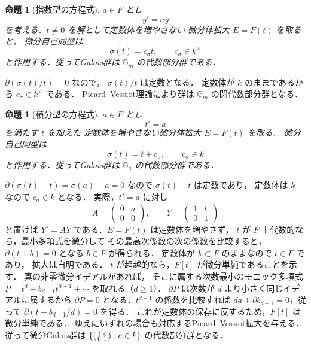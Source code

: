 \documentclass[a5paper,10pt,onecolumn]{jsarticle}
\makeatletter
\theoremstyle{mathnotetheorem}
\newtheorem{proposition}[theorem]{命題}
\renewcommand{\proofname}{証明}
\renewenvironment{proof}[1][\proofname]{%
  \par\pushQED{\qed}\normalfont\topsep4\p@\@plus2\p@\relax
  \trivlist\item[\hskip\labelsep\bfseries #1]\ignorespaces
}{\popQED\endtrivlist\@endpefalse}
\makeatother
\begin{document}
\begin{proposition}[指数型の方程式]\label{prop:exp}
$a\in F$ とし
\[
 y'=ay
\]
を考える．$t\ne0$ を解として定数体を増やさない
微分体拡大 $E=F(t)$ を取ると，
微分自己同型は
\[
 \sigma(t)=c_\sigma t,\qquad c_\sigma\in k^\times
\]
と作用する．従ってGalois群は
$\mathbb G_m$ の代数部分群である．
\end{proposition}
\begin{proof}
$\partial(\sigma(t)/t)=0$ なので，
$\sigma(t)/t$ は定数となる．
定数体が $k$ のままであるから
$c_\sigma\in k^\times$ である．
Picard--Vessiot理論により群は
$\mathbb G_m$ の閉代数部分群となる．
\end{proof}

\begin{proposition}[積分型の方程式]\label{prop:int}
$a\in F$ とし
\[
 t'=a
\]
を満たす $t$ を加えた
定数体を増やさない微分体拡大 $E=F(t)$ を取る．
微分自己同型は
\[
 \sigma(t)=t+c_\sigma,\qquad c_\sigma\in k
\]
と作用する．従ってGalois群は
$\mathbb G_a$ の代数部分群である．
\end{proposition}
\begin{proof}
$\partial(\sigma(t)-t)=\sigma(a)-a=0$ なので
$\sigma(t)-t$ は定数であり，
定数体は $k$ なので $c_\sigma\in k$ となる．
実際，$t'=a$ に対し
\[
 A=\begin{pmatrix}0&a\\0&0\end{pmatrix},\qquad
 Y=\begin{pmatrix}1&t\\0&1\end{pmatrix}
\]
と置けば $Y'=AY$ である．$E=F(t)$ は定数体を増やさず，
$t$ が $F$ 上代数的なら，最小多項式を微分して
その最高次係数の次の係数を比較すると，
$\partial(t+b)=0$ となる $b\in F$ が得られる．
定数体が $k\subset F$ のままなので $t\in F$ であり，
拡大は自明である．
$t$ が超越的なら，$F[t]$ が微分単純であることを示す．
真の非零微分イデアルがあれば，
そこに属する次数最小のモニック多項式
$P=t^d+b_{d-1}t^{d-1}+\cdots$ を取れる（$d\ge1$）．
$\partial P$ は次数が $d$ より小さく同じイデアルに属するから
$\partial P=0$ となる．$t^{d-1}$ の係数を比較すれば
$da+\partial b_{d-1}=0$，従って
$\partial(t+b_{d-1}/d)=0$ を得る．
これが定数体の保存に反するため，$F[t]$ は微分単純である．
ゆえにいずれの場合も対応するPicard--Vessiot拡大を与える．
従って微分Galois群は
$\left\{\begin{psmallmatrix}1&c\\0&1\end{psmallmatrix}:c\in k\right\}$
の代数部分群となる．
\end{proof}
\end{document}

